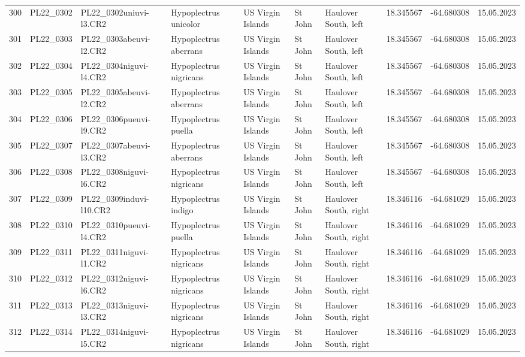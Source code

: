 \begin{table}[ht]
\begin{tabular}{rlllllllll}
  300 & PL22\_0302 & PL22\_0302uniuvi-l3.CR2 & Hypoplectrus unicolor & US Virgin Islands & St John & Haulover South, left & 18.345567 & -64.680308 & 15.05.2023 \\ 
  301 & PL22\_0303 & PL22\_0303abeuvi-l2.CR2 & Hypoplectrus aberrans & US Virgin Islands & St John & Haulover South, left & 18.345567 & -64.680308 & 15.05.2023 \\ 
  302 & PL22\_0304 & PL22\_0304niguvi-l4.CR2 & Hypoplectrus nigricans & US Virgin Islands & St John & Haulover South, left & 18.345567 & -64.680308 & 15.05.2023 \\ 
  303 & PL22\_0305 & PL22\_0305abeuvi-l2.CR2 & Hypoplectrus aberrans & US Virgin Islands & St John & Haulover South, left & 18.345567 & -64.680308 & 15.05.2023 \\ 
  304 & PL22\_0306 & PL22\_0306pueuvi-l9.CR2 & Hypoplectrus puella & US Virgin Islands & St John & Haulover South, left & 18.345567 & -64.680308 & 15.05.2023 \\ 
  305 & PL22\_0307 & PL22\_0307abeuvi-l3.CR2 & Hypoplectrus aberrans & US Virgin Islands & St John & Haulover South, left & 18.345567 & -64.680308 & 15.05.2023 \\ 
  306 & PL22\_0308 & PL22\_0308niguvi-l6.CR2 & Hypoplectrus nigricans & US Virgin Islands & St John & Haulover South, left & 18.345567 & -64.680308 & 15.05.2023 \\ 
  307 & PL22\_0309 & PL22\_0309induvi-l10.CR2 & Hypoplectrus indigo & US Virgin Islands & St John & Haulover South, right & 18.346116 & -64.681029 & 15.05.2023 \\ 
  308 & PL22\_0310 & PL22\_0310pueuvi-l4.CR2 & Hypoplectrus puella & US Virgin Islands & St John & Haulover South, right & 18.346116 & -64.681029 & 15.05.2023 \\ 
  309 & PL22\_0311 & PL22\_0311niguvi-l1.CR2 & Hypoplectrus nigricans & US Virgin Islands & St John & Haulover South, right & 18.346116 & -64.681029 & 15.05.2023 \\ 
  310 & PL22\_0312 & PL22\_0312niguvi-l6.CR2 & Hypoplectrus nigricans & US Virgin Islands & St John & Haulover South, right & 18.346116 & -64.681029 & 15.05.2023 \\ 
  311 & PL22\_0313 & PL22\_0313niguvi-l3.CR2 & Hypoplectrus nigricans & US Virgin Islands & St John & Haulover South, right & 18.346116 & -64.681029 & 15.05.2023 \\ 
  312 & PL22\_0314 & PL22\_0314niguvi-l5.CR2 & Hypoplectrus nigricans & US Virgin Islands & St John & Haulover South, right & 18.346116 & -64.681029 & 15.05.2023 \\ 

\end{tabular}
\end{table}
